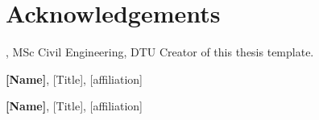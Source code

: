 \section*{Acknowledgements}
\textbf{\thesisauthor}, MSc Civil Engineering, DTU \newline
Creator of this thesis template.

\textbf{[Name]}, [Title], [affiliation] \newline
[text]

\textbf{[Name]}, [Title], [affiliation] \newline
[text]
